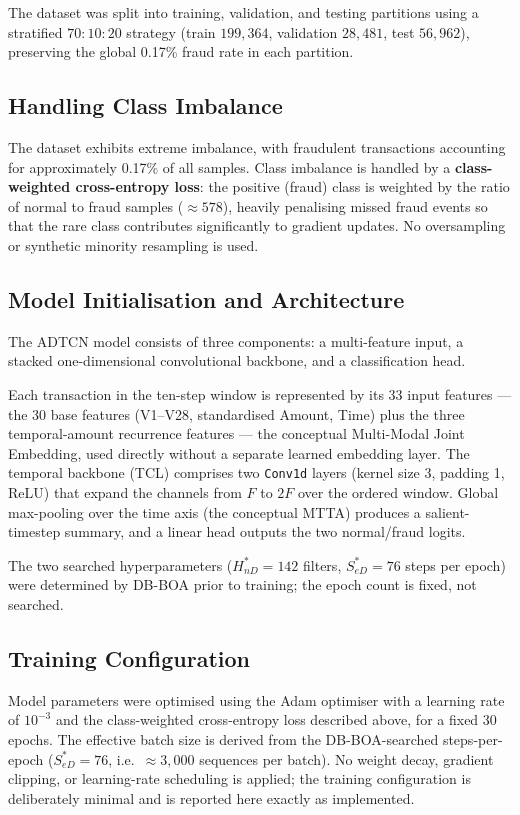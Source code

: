 The dataset was split into training, validation, and testing partitions using a stratified $70{:}10{:}20$ strategy (train $199{,}364$, validation $28{,}481$, test $56{,}962$), preserving the global 0.17\% fraud rate in each partition.

\subsection*{Handling Class Imbalance}

The dataset exhibits extreme imbalance, with fraudulent transactions accounting for approximately 0.17\% of all samples. Class imbalance is handled by a \textbf{class-weighted cross-entropy loss}: the positive (fraud) class is weighted by the ratio of normal to fraud samples ($\approx 578$), heavily penalising missed fraud events so that the rare class contributes significantly to gradient updates. No oversampling or synthetic minority resampling is used.

\subsection*{Model Initialisation and Architecture}

The ADTCN model consists of three components: a multi-feature input, a stacked one-dimensional convolutional backbone, and a classification head.

Each transaction in the ten-step window is represented by its 33 input features — the 30 base features (V1--V28, standardised Amount, Time) plus the three temporal-amount recurrence features — the conceptual Multi-Modal Joint Embedding, used directly without a separate learned embedding layer. The temporal backbone (TCL) comprises two \texttt{Conv1d} layers (kernel size 3, padding 1, ReLU) that expand the channels from $F$ to $2F$ over the ordered window. Global max-pooling over the time axis (the conceptual MTTA) produces a salient-timestep summary, and a linear head outputs the two normal/fraud logits.

The two searched hyperparameters ($H_{nD}^\ast = 142$ filters, $S_{eD}^\ast = 76$ steps per epoch) were determined by DB-BOA prior to training; the epoch count is fixed, not searched.

\subsection*{Training Configuration}

Model parameters were optimised using the Adam optimiser with a learning rate of $10^{-3}$ and the class-weighted cross-entropy loss described above, for a fixed 30 epochs. The effective batch size is derived from the DB-BOA-searched steps-per-epoch ($S_{eD}^\ast=76$, i.e.\ $\approx 3{,}000$ sequences per batch). No weight decay, gradient clipping, or learning-rate scheduling is applied; the training configuration is deliberately minimal and is reported here exactly as implemented.

